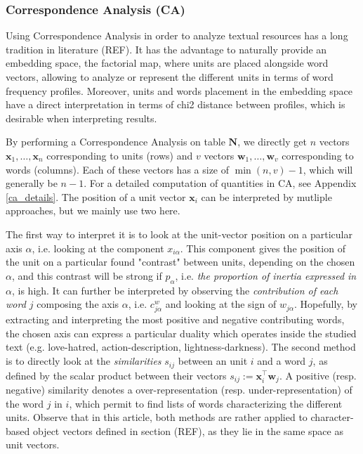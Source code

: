 \documentclass[
twocolumn,
]{ceurart}
\begin{document}
\subsubsection{Correspondence Analysis (CA)}
\label{ca_method}

Using Correspondence Analysis in order to analyze textual resources has a long tradition in literature (REF). It has the advantage to naturally provide an embedding space, the factorial map, where units are placed alongside word vectors, allowing to analyze or represent the different units in terms of word frequency profiles. Moreover, units and words placement in the embedding space have a direct interpretation in terms of chi2 distance between profiles, which is desirable when interpreting results.

By performing a Correspondence Analysis on table $\mathbf{N}$, we directly get $n$ vectors $\mathbf{x}_1, \ldots, \mathbf{x}_n$ corresponding to units (rows) and $v$ vectors $\mathbf{w}_1, \ldots, \mathbf{w}_v$ corresponding to words (columns). Each of these vectors has a size of $\min(n, v) - 1$, which will generally be $n - 1$. For a detailed computation of quantities in CA, see Appendix \ref{ca_details}. The position of a unit vector $\mathbf{x}_i$ can be interpreted by mutliple approaches, but we mainly use two here.

The first way to interpret it is to look at the unit-vector position on a particular axis $\alpha$, i.e. looking at the component $x_{i\alpha}$. This component gives the position of the unit on a particular found "contrast" between units, depending on the chosen $\alpha$, and this contrast will be strong if $p_\alpha$, i.e. \emph{the proportion of inertia expressed in $\alpha$}, is high. It can further be interpreted by observing the \emph{contribution of each word $j$} composing the axis $\alpha$, i.e. $c^w_{j\alpha}$ and looking at the sign of $w_{j\alpha}$. Hopefully, by extracting and interpreting the most positive and negative contributing words, the chosen axis can express a particular duality which operates inside the studied text (e.g. love-hatred, action-description, lightness-darkness). The second method is to directly look at the \emph{similarities} $s_{ij}$ between an unit $i$ and a word $j$, as defined by the scalar product between their vectors $s_{ij} := \mathbf{x}^\top_i \mathbf{w}_j$. A positive (resp. negative) similarity denotes a over-representation (resp. under-representation) of the word $j$ in $i$, which permit to find lists of words characterizing the different units. Observe that in this article, both methods are rather applied to character-based object vectors defined in section (REF), as they lie in the same space as unit vectors. 
\end{document}
